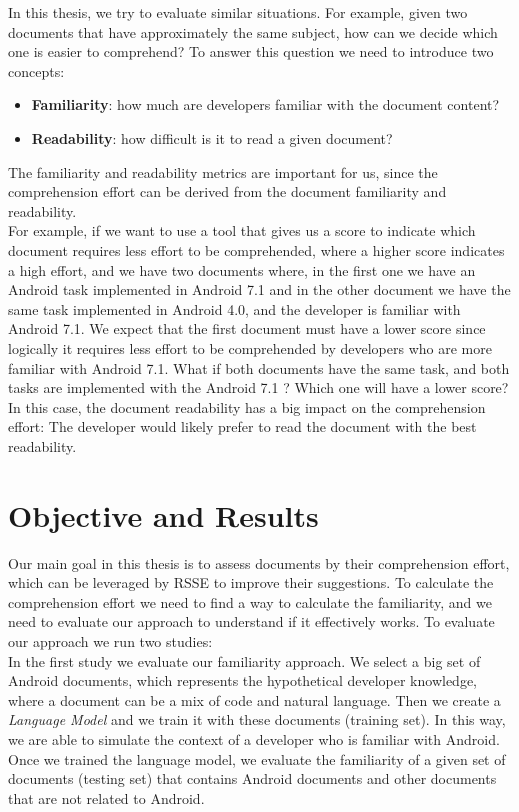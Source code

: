 \documentclass[12pt,mscthesis]{usiinfthesis}
\begin{document}
	In this thesis, we try to evaluate similar situations. For example, given two documents that have approximately the same subject, how can we decide which one is easier to comprehend? To answer this question we need to introduce two concepts:
	\begin{itemize}
	\item \textbf{Familiarity}: how much are developers familiar with the document content?
	\item \textbf{Readability}: how difficult is it to read a given document?
	\end{itemize}
	The familiarity and readability metrics are important for us, since the comprehension effort can be derived from the document familiarity and readability.\\
	For example, if we want to use a tool that gives us a score to indicate which document requires less effort to be comprehended, where a higher score indicates a high effort, and we have two documents where, in the first one we have an Android task implemented in Android 7.1 and in the other document we have the same task implemented in Android 4.0, and the developer is familiar with Android 7.1.
	We expect that the first document must have a lower score since logically it requires less effort to be comprehended by developers who are more familiar with Android 7.1.
	What if both documents have the same task, and both tasks are implemented with the Android 7.1 ? Which one will have a lower score? 
	In this case, the document readability has a big impact on the comprehension effort: The developer would likely prefer to read the document with the best readability.\\
	
	\section{Objective and Results}
	Our main goal in this thesis is to assess documents by their comprehension effort, which can be leveraged by RSSE to improve their suggestions.
	To calculate the comprehension effort we need to find a way to calculate the familiarity, and we need to evaluate our approach to understand if it effectively works.
	To evaluate our approach we run two studies:\\

	 In the first study we evaluate our familiarity approach. We select a big set of Android documents, which represents the hypothetical developer knowledge, where a document can be a mix of code and natural language. Then we create a \emph{ Language Model} \cite{Hindle:2012:NS:2337223.2337322} and we train it with these documents (training set). In this way, we are able to simulate the context of a developer who is familiar with Android. Once we trained the language model, we evaluate the familiarity of a given set of documents (testing set) that contains Android documents and other documents that are not related to Android.
\end{document}
